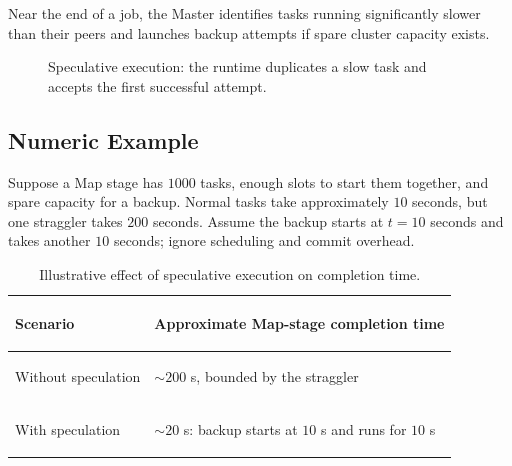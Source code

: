 \documentclass[11pt,a4paper,oneside]{book}
\begin{document}
Near the end of a job, the Master identifies tasks running significantly slower than their peers and launches backup attempts if spare cluster capacity exists.

\begin{figure}[htbp]
\centering
{}
\caption{Speculative execution: the runtime duplicates a slow task and accepts the first successful attempt.}
\label{fig:speculative-execution}
\end{figure}

\subsection{Numeric Example}

Suppose a Map stage has \(1000\) tasks, enough slots to start them together, and spare capacity for a backup. Normal tasks take approximately \(10\) seconds, but one straggler takes \(200\) seconds. Assume the backup starts at \(t=10\) seconds and takes another \(10\) seconds; ignore scheduling and commit overhead.

\begin{table}[htbp]
\centering
\caption{Illustrative effect of speculative execution on completion time.}
\label{tab:speculation-example}
\begin{tabularx}{0.78\textwidth}{>{\bfseries\raggedright\arraybackslash}p{4.2cm} Y}
\toprule
{}
Scenario & Approximate Map-stage completion time \\
\midrule
Without speculation & \(\sim 200\) s, bounded by the straggler \\
With speculation & \(\sim 20\) s: backup starts at \(10\) s and runs for \(10\) s \\
\bottomrule
\end{tabularx}
\end{table}
\end{document}

